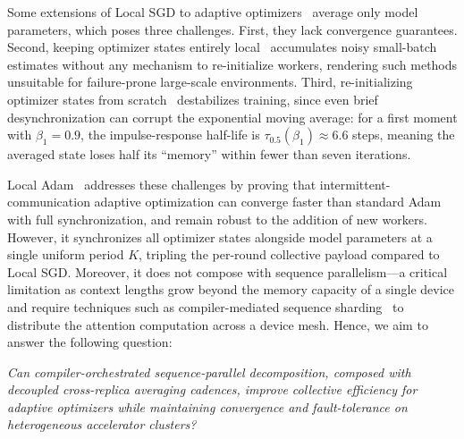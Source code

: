 \documentclass{article}
\begin{document}
Some extensions of Local SGD to adaptive optimizers~\citep{sani2025photon,douillard2023diloco}
average only model parameters, which poses three challenges.
First, they lack convergence guarantees.
Second, keeping optimizer states entirely local~\citep{douillard2023diloco} accumulates noisy
small-batch estimates without any mechanism to re-initialize workers, rendering such methods
unsuitable for failure-prone large-scale environments.
Third, re-initializing optimizer states from scratch~\citep{sani2024future,sani2025photon}
destabilizes training, since even brief desynchronization can corrupt the exponential moving
average: for a first moment with $\beta_1 = 0.9$, the impulse-response half-life is
$\tau_{0.5}(\beta_1) \approx 6.6$ steps, meaning the averaged state loses half its ``memory''
within fewer than seven iterations.

Local Adam~\citep{cheng2025convergence} addresses these challenges by proving that intermittent-communication
adaptive optimization can converge faster than standard Adam with full synchronization, and
remain robust to the addition of new workers. However, it synchronizes all optimizer states
alongside model parameters at a single uniform period $K$, tripling the per-round
collective payload compared to Local SGD.
Moreover, it does not compose with sequence parallelism---a critical limitation as context
lengths grow beyond the memory capacity of a single device and require techniques such as
compiler-mediated sequence sharding~\citep{jacobs2023deepspeed,fang2024unified} to distribute
the attention computation across a device mesh.
Hence, we aim to answer the following question:

\begin{center}
\emph{Can compiler-orchestrated sequence-parallel decomposition, composed with
decoupled cross-replica averaging cadences, improve collective efficiency for
adaptive optimizers while maintaining convergence and fault-tolerance
on heterogeneous accelerator clusters?}
\end{center}
\end{document}
